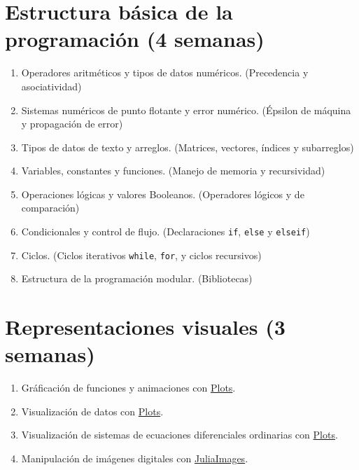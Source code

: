 \documentclass[a4paper]{article}
\begin{document}
\section{Estructura básica de la programación (4 semanas)} \label{Sec: Estructura básica de la programación (4 semanas)}

\begin{enumerate}[label=\arabic*.]

    \item Operadores aritméticos y tipos de datos numéricos. (Precedencia y asociatividad)
    \item Sistemas numéricos de punto flotante y error numérico. (Épsilon de máquina y propagación de error)
    \item Tipos de datos de texto y arreglos. (Matrices, vectores, índices y subarreglos)
    \item Variables, constantes y funciones. (Manejo de memoria y recursividad)
    \item Operaciones lógicas y valores Booleanos. (Operadores lógicos y de comparación)
    \item Condicionales y control de flujo. (Declaraciones \texttt{if}, \texttt{else} y \texttt{elseif})
    \item Ciclos. (Ciclos iterativos \texttt{while}, \texttt{for}, y ciclos recursivos)
    \item Estructura de la programación modular. (Bibliotecas)
\end{enumerate}

\section{Representaciones visuales (3 semanas)} \label{Sec: Representaciones visuales (3 semanas)}

\begin{enumerate}[label=\arabic*.]

    \item Gráficación de funciones y animaciones con \href{https://docs.juliaplots.org/latest/}{Plots}.
    \item Visualización de datos con \href{https://docs.juliaplots.org/latest/}{Plots}.
    \item Visualización de sistemas de ecuaciones diferenciales ordinarias con \href{https://docs.juliaplots.org/latest/}{Plots}.
    \item Manipulación de imágenes digitales con \href{https://juliaimages.org/latest/}{JuliaImages}.
\end{enumerate}
\end{document}
